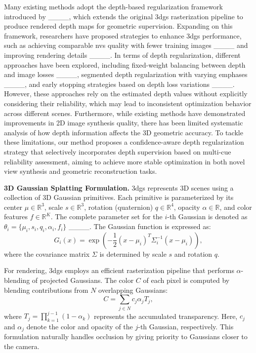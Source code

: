 \begin{sloppypar}
Many existing methods adopt the depth-based regularization framework introduced by ____, which extends the original \gls{3dgs} rasterization pipeline to produce rendered depth maps for geometric supervision. 
Expanding on this framework, researchers have proposed strategies to enhance \gls{3dgs} performance, such as achieving comparable \gls{nvs} quality with fewer training images ____ and improving rendering details ____. 
In terms of depth regularization, different approaches have been explored, including fixed-weight balancing between depth and image losses ____, segmented depth regularization with varying emphases ____, and early stopping strategies based on depth loss variations ____.
However, these approaches rely on the estimated depth values without explicitly considering their reliability, which may lead to inconsistent optimization behavior across different scenes. 
Furthermore, while existing methods have demonstrated improvements in 2D image synthesis quality, there has been limited systematic analysis of how depth information affects the 3D geometric accuracy.  
To tackle these limitations, our method proposes a confidence-aware depth regularization strategy that selectively incorporates depth supervision based on multi-cue reliability assessment, aiming to achieve more stable optimization in both novel view synthesis and geometric reconstruction tasks.
\end{sloppypar}

\textbf{3D Gaussian Splatting Formulation.}
\gls{3dgs} represents 3D scenes using a collection of 3D Gaussian primitives. Each primitive is parameterized by its center \( \mu \in \mathbb{R}^3 \), scale \( s \in \mathbb{R}^3 \), rotation (quaternion) \( q \in \mathbb{R}^4 \), opacity \( \alpha \in \mathbb{R} \), and color features \( f \in \mathbb{R}^K \). The complete parameter set for the \( i \)-th Gaussian is denoted as \( \theta_i = \{ \mu_i, s_i, q_i, \alpha_i, f_i \} \) ____. The Gaussian function is expressed as:
\begin{equation}
G_i(x) = \exp \left(-\frac{1}{2} (x - \mu_i)^T \Sigma_i^{-1} (x - \mu_i)\right),
\end{equation}
where the covariance matrix \( \Sigma \) is determined by scale \( s \) and rotation \( q \).

For rendering, \gls{3dgs} employs an efficient rasterization pipeline that performs \(\alpha\)-blending of projected Gaussians. The color \( C \) of each pixel is computed by blending contributions from \( N \) overlapping Gaussians:
\begin{equation}
C = \sum_{j \in N} c_j \alpha_j T_j,
\end{equation}
where \( T_j = \prod_{k=1}^{j-1} (1 - \alpha_k) \) represents the accumulated transparency. Here, \( c_j \) and \( \alpha_j \) denote the color and opacity of the \( j \)-th Gaussian, respectively. This formulation naturally handles occlusion by giving priority to Gaussians closer to the camera.


